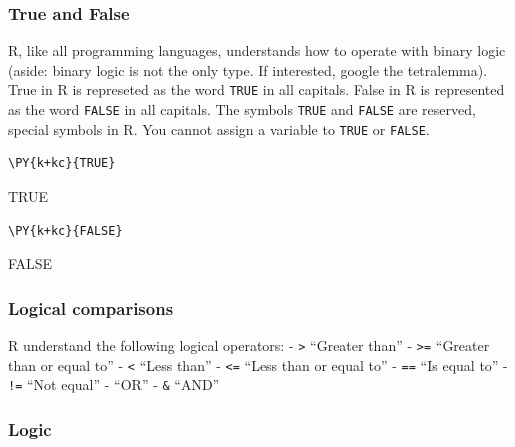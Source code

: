 \hypertarget{true-and-false}{%
\subsubsection{True and False}\label{true-and-false}}

R, like all programming languages, understands how to operate with
binary logic (aside: binary logic is not the only type. If interested,
google the tetralemma). True in R is represeted as the word
\texttt{TRUE} in all capitals. False in R is represented as the word
\texttt{FALSE} in all capitals. The symbols \texttt{TRUE} and
\texttt{FALSE} are reserved, special symbols in R. You cannot assign a
variable to \texttt{TRUE} or \texttt{FALSE}.

    \begin{tcolorbox}[breakable, size=fbox, boxrule=1pt, pad at break*=1mm,colback=cellbackground, colframe=cellborder]
\begin{Verbatim}[commandchars=\\\{\}]
\PY{k+kc}{TRUE}
\end{Verbatim}
\end{tcolorbox}

    TRUE

    
    \begin{tcolorbox}[breakable, size=fbox, boxrule=1pt, pad at break*=1mm,colback=cellbackground, colframe=cellborder]
\begin{Verbatim}[commandchars=\\\{\}]
\PY{k+kc}{FALSE}
\end{Verbatim}
\end{tcolorbox}

    FALSE

    
    \hypertarget{logical-comparisons}{%
\subsubsection{Logical comparisons}\label{logical-comparisons}}

R understand the following logical operators: - \texttt{\textgreater{}}
``Greater than'' - \texttt{\textgreater{}=} ``Greater than or equal to''
- \texttt{\textless{}} ``Less than'' - \texttt{\textless{}=} ``Less than
or equal to'' - \texttt{==} ``Is equal to'' - \texttt{!=} ``Not equal''
- \texttt{\textbar{}} ``OR'' - \texttt{\&} ``AND''

\hypertarget{logic}{%
\subsubsection{Logic}\label{logic}}

